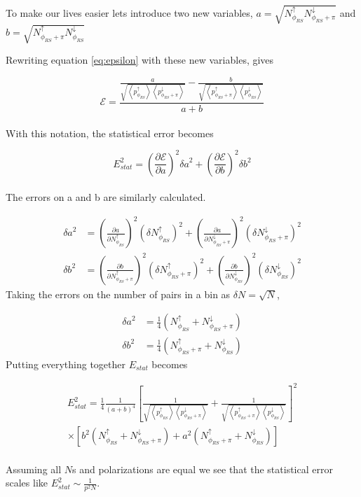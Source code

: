 \documentclass[abstract = on,listof=totoc, bibliography=totoc]{scrreprt}
\newcommand{\phirs}{\phi_{RS}}
\begin{document}
To make our lives easier lets introduce two new variables, $a = \sqrt{N^\uparrow_{\phi_{RS}}N^\downarrow_{\phi_{RS}+\pi}}$ and $b = \sqrt{N^\uparrow_{\phi_{RS}+\pi}N^\downarrow_{\phi_{RS}}}$

Rewriting equation \ref{eq:epsilon} with these new variables, gives

\begin{equation}
\label{eq:epsilonAB}
\mathcal{E} = \frac{\frac{a}{\sqrt{\left<p^\uparrow_{\phirs}\right>\left<p^\downarrow_{\phirs+\pi}\right>}}  - \frac{b}{\sqrt{\left<p^\uparrow_{\phirs+\pi}\right>\left<p^\downarrow_{\phirs}\right>}}} {a+b}
\end{equation}\\
%
With this notation, the statistical error becomes

\begin{equation}
\label{eq:Estat}
E_{stat}^2 = \left(\frac{\partial \mathcal{E}}{\partial a}\right)^2 {\delta a}^2 + \left(\frac{\partial \mathcal{E}}{\partial b}\right)^2 {\delta b}^2
\end{equation}\\
%
The errors on a and b are similarly calculated. 


\begin{align}
{\delta a}^2 &= \left(\frac{\partial a}{\partial N^\uparrow_{\phirs}}\right)^2 \left(\delta N^\uparrow_{\phirs}\right)^2 + \left(\frac{\partial a}{\partial N^\downarrow_{\phirs+\pi}}\right)^2 \left(\delta N^\downarrow_{\phirs+\pi}\right)^2 \\
{\delta b}^2 &= \left(\frac{\partial b}{\partial N^\uparrow_{\phirs+\pi}}\right)^2 \left(\delta N^\uparrow_{\phirs+\pi}\right)^2 + \left(\frac{\partial b}{\partial N^\downarrow_{\phirs}}\right)^2 \left(\delta N^\downarrow_{\phirs}\right)^2 
\end{align}
%
Taking the errors on the number of pairs in a bin as $\delta N = \sqrt{N}$,

\begin{align}
{\delta a}^2 &= \frac{1}{4}\left(N^\uparrow_{\phirs}+ N^\downarrow_{\phirs+\pi}\right)\\
{\delta b}^2 &=  \frac{1}{4}\left(N^\uparrow_{\phirs+\pi}+ N^\downarrow_{\phirs}\right)
\end{align}
%
Putting everything together $E_{stat}$ becomes

\begin{align}
E_{stat}^2 = \frac{1}{4}\frac{1}{\left(a+b\right)^4} \left[\frac{1}{\sqrt{\left<p^\uparrow_{\phirs}\right>\left<p^\downarrow_{\phirs+\pi}\right>}}+\frac{1}{\sqrt{\left<p^\uparrow_{\phirs+\pi}\right>\left<p^\downarrow_{\phirs}\right>}}\right]^2 \\ \nonumber
\times \left[b^2\left(N^\uparrow_{\phirs} + N^\downarrow_{\phirs+\pi}\right) + a^2 \left(N^\uparrow_{\phirs+\pi} +  N^\downarrow_{\phirs} \right)\right]
\end{align}\\
%
Assuming all $N$s and polarizations are equal we see that the statistical error scales like $E_{stat}^2 \sim \frac{1}{p^2 N}$.
\end{document}
